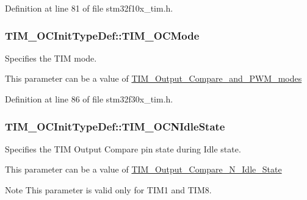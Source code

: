 Definition at line 81 of file stm32f10x\-\_\-tim.\-h.

\hypertarget{struct_t_i_m___o_c_init_type_def_a99dec30fcc0710fd304a6ba4a92c3f12}{
\subsubsection[{T\-I\-M\-\_\-\-O\-C\-Mode}]{ T\-I\-M\-\_\-\-O\-C\-Init\-Type\-Def\-::\-T\-I\-M\-\_\-\-O\-C\-Mode}}\label{struct_t_i_m___o_c_init_type_def_a99dec30fcc0710fd304a6ba4a92c3f12}
\begin{DoxyVerb}        Specifies the TIM mode.
\end{DoxyVerb}
 This parameter can be a value of \hyperlink{group___t_i_m___output___compare__and___p_w_m__modes}{T\-I\-M\-\_\-\-Output\-\_\-\-Compare\-\_\-and\-\_\-\-P\-W\-M\-\_\-modes} 

Definition at line 86 of file stm32f30x\-\_\-tim.\-h.

\hypertarget{struct_t_i_m___o_c_init_type_def_a6cbbe6eb87c2ab49e4d68fa9703ce949}{
\subsubsection[{T\-I\-M\-\_\-\-O\-C\-N\-Idle\-State}]{ T\-I\-M\-\_\-\-O\-C\-Init\-Type\-Def\-::\-T\-I\-M\-\_\-\-O\-C\-N\-Idle\-State}}\label{struct_t_i_m___o_c_init_type_def_a6cbbe6eb87c2ab49e4d68fa9703ce949}
\begin{DoxyVerb}  Specifies the TIM Output Compare pin state during Idle state.
\end{DoxyVerb}
 This parameter can be a value of \hyperlink{group___t_i_m___output___compare___n___idle___state}{T\-I\-M\-\_\-\-Output\-\_\-\-Compare\-\_\-\-N\-\_\-\-Idle\-\_\-\-State} \begin{DoxyNote}{Note}
This parameter is valid only for T\-I\-M1 and T\-I\-M8. 
\end{DoxyNote}


